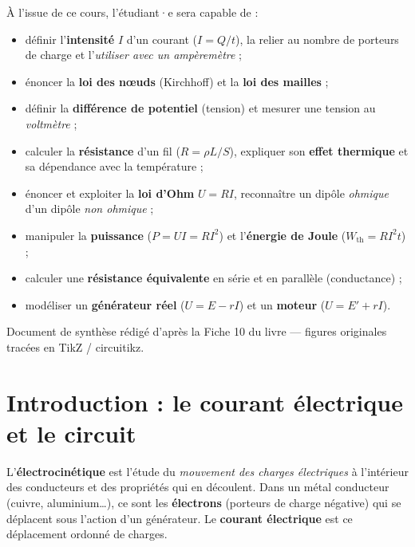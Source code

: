 \documentclass[11pt,a4paper]{article}
\begin{document}
\begin{tcolorbox}[boxbase,colback=primary!5,colframe=primary,width=15cm,
    title={\textsc{Objectifs pédagogiques de la fiche}}]
À l'issue de ce cours, l'étudiant·e sera capable de :
\begin{itemize}[leftmargin=1.6em,topsep=2pt,itemsep=1pt]
  \item définir l'\textbf{intensité} $I$ d'un courant ($I=Q/t$), la relier au nombre de porteurs de charge et l'\emph{utiliser avec un ampèremètre} ;
  \item énoncer la \textbf{loi des nœuds} (Kirchhoff) et la \textbf{loi des mailles} ;
  \item définir la \textbf{différence de potentiel} (tension) et mesurer une tension au \emph{voltmètre} ;
  \item calculer la \textbf{résistance} d'un fil ($R=\rho L/S$), expliquer son \textbf{effet thermique} et sa dépendance avec la température ;
  \item énoncer et exploiter la \textbf{loi d'Ohm} $U=RI$, reconnaître un dipôle \emph{ohmique} d'un dipôle \emph{non ohmique} ;
  \item manipuler la \textbf{puissance} ($P=UI=RI^2$) et l'\textbf{énergie de Joule} ($W_{\mathrm{th}}=RI^2t$) ;
  \item calculer une \textbf{résistance équivalente} en série et en parallèle (conductance) ;
  \item modéliser un \textbf{générateur réel} ($U=E-rI$) et un \textbf{moteur} ($U=E'+rI$).
\end{itemize}
\end{tcolorbox}

\vspace{0.4cm}
{\small\color{black!60} Document de synthèse rédigé d'après la Fiche 10 du livre — figures originales tracées en TikZ / circuitikz.}
\par
\endgroup

\newpage
\renewcommand{\contentsname}{\textcolor{primarydark}{Table des matières}}
\tableofcontents
\thispagestyle{fancy}
\newpage

\section{Introduction : le courant électrique et le circuit}
L'\textbf{électrocinétique} est l'étude du \emph{mouvement des charges électriques} à l'intérieur
des conducteurs et des propriétés qui en découlent. Dans un métal conducteur (cuivre, aluminium\ldots),
ce sont les \textbf{électrons} (porteurs de charge négative) qui se déplacent sous l'action d'un
générateur. Le \textbf{courant électrique} est ce déplacement ordonné de charges.
\end{document}
